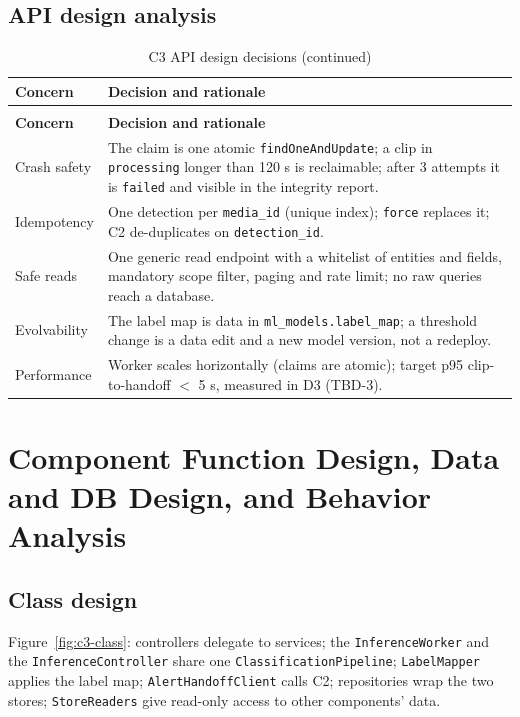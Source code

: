 \subsection{API design analysis}
\begin{longtable}{L{2.8cm}L{12.0cm}}
\caption{C3 API design decisions}\\
\toprule
\textbf{Concern} & \textbf{Decision and rationale} \\
\midrule
\endfirsthead
\caption[]{C3 API design decisions (continued)}\\
\toprule
\textbf{Concern} & \textbf{Decision and rationale} \\
\midrule
\endhead
Crash safety & The claim is one atomic \texttt{findOneAndUpdate}; a clip in \texttt{processing} longer than 120 s is reclaimable; after 3 attempts it is \texttt{failed} and visible in the integrity report. \\
Idempotency & One detection per \texttt{media\_id} (unique index); \texttt{force} replaces it; C2 de-duplicates on \texttt{detection\_id}. \\
Safe reads & One generic read endpoint with a whitelist of entities and fields, mandatory scope filter, paging and rate limit; no raw queries reach a database. \\
Evolvability & The label map is data in \texttt{ml\_models.label\_map}; a threshold change is a data edit and a new model version, not a redeploy. \\
Performance & Worker scales horizontally (claims are atomic); target p95 clip-to-handoff $<$ 5 s, measured in D3 (TBD-3). \\
\bottomrule
\end{longtable}

\section{Component Function Design, Data and DB Design, and Behavior Analysis}

\subsection{Class design}
Figure~\ref{fig:c3-class}: controllers delegate to services; the \texttt{InferenceWorker} and the
\texttt{InferenceController} share one \texttt{ClassificationPipeline}; \texttt{LabelMapper} applies the label map;
\texttt{AlertHandoffClient} calls C2; repositories wrap the two stores; \texttt{StoreReaders} give read-only access to
other components' data.

